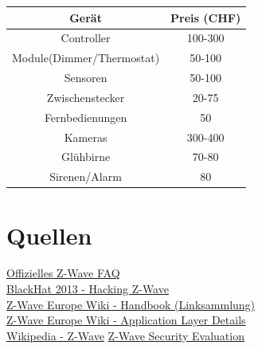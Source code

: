 \documentclass[a4paper,11pt]{article}
\begin{document}
\begin{tabular}{| c | c |}
	\hline
	\textbf{Gerät} & Preis (CHF) \\\hline
	Controller & 100-300 \\\hline
	Module(Dimmer/Thermostat) & 50-100 \\\hline
	Sensoren & 50-100 \\\hline
	Zwischenstecker & 20-75 \\\hline
	Fernbedienungen & 50 \\\hline
	Kameras & 300-400 \\\hline
	Glühbirne & 70-80 \\\hline
	Sirenen/Alarm & 80 \\\hline
	
\end{tabular}

\section*{Quellen}

\href{http://www.z-wave.com/faq}{Offizielles Z-Wave FAQ}\\
\href{https://www.youtube.com/watch?v=KYaEQhvodc8}{BlackHat 2013 - Hacking Z-Wave}\\
\href{http://wiki.zwaveeurope.com/index.php?title=Z-Wave_Technical_Handbook}{Z-Wave Europe Wiki - Handbook (Linksammlung)}\\
\href{http://wiki.zwaveeurope.com/index.php?title=Z-Wave_Application_Layer}{Z-Wave Europe Wiki - Application Layer Details}\\
\href{https://en.wikipedia.org/wiki/Z-Wave}{Wikipedia - Z-Wave}
\href{https://www.sensepost.com/cms/resources/conferences/2013/bh_zwave/Security\%20Evaluation\%20of\%20Z-Wave_WP.pdf}{Z-Wave Security Evaluation}
\end{document}

